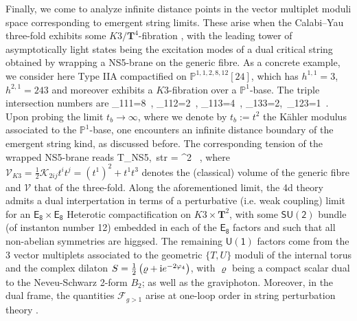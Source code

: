 Finally, we come to analyze infinite distance points in the vector multiplet moduli space corresponding to emergent string limits. These arise when the Calabi--Yau three-fold exhibits some $K3/\mathbf{T}^4$-fibration \cite{Lee:2019wij}, with the leading tower of asymptotically light states being the excitation modes of a dual critical string obtained by wrapping a NS5-brane on the generic fibre. As a concrete example, we consider here Type IIA compactified on $\mathbb{P}^{1,1,2,8,12}[24]$, which has $h^{1,1}=3$, $h^{2,1}=243$ and moreover exhibits a $K3$-fibration over a $\mathbb{P}^1$-base. The triple intersection numbers are \cite{Hosono:1994ax}
%
\beq
	_{111}=8\, , \quad {}_{112}=2\, , \quad {}_{113}=4\, , \quad {}_{133}=2,\, \quad {}_{123}=1\, .
\label{eq:triplenumbers}
\eeq
%
Upon probing the limit $t_b \to \infty$, where we denote by $t_b:= t^2$ the K\"ahler modulus associated to the $\mathbb{P}^1$-base, one encounters an infinite distance boundary of the emergent string kind, as discussed before. The corresponding tension of the wrapped NS5-brane reads
%
\beq
	T_{\rm NS5,\, str} = \Mpf^2 \, ,
\label{eq:hettension}
\eeq
%
where $\mathcal{V}_{K3} = \frac{1}{2} \mathcal{K}_{2ij} t^i t^j = (t^1)^2 + t^1 t^3$ denotes the (classical) volume of the generic fibre and $\mathcal{V}$ that of the three-fold. Along the aforementioned limit, the 4d theory admits a dual interpertation in terms of a perturbative (i.e. weak coupling) limit for an $\mathsf{E_8} \times \mathsf{E_8}$ Heterotic compactification on $K3 \times \mathbf{T}^2$, with some $\mathsf{SU(2)}$ bundle (of instanton number 12) embedded in each of the $\mathsf{E_8}$ factors and such that all non-abelian symmetries are higgsed. The remaining $\mathsf{U(1)}$ factors come from the 3 vector multiplets associated to the geometric $\{T,U\}$ moduli of the internal torus and the complex dilaton $S= \frac{1}{2}\left(\varrho + \text{i} e^{-2\varphi_4}\right)$, with $\varrho$ being a compact scalar dual to the Neveu-Schwarz 2-form $B_2$; as well as the graviphoton. Moreover, in the dual frame, the quantities $\mathcal{F}_{g>1}$ arise at one-loop order in string perturbation theory \cite{Antoniadis:1993ze,Antoniadis:1995zn}.

